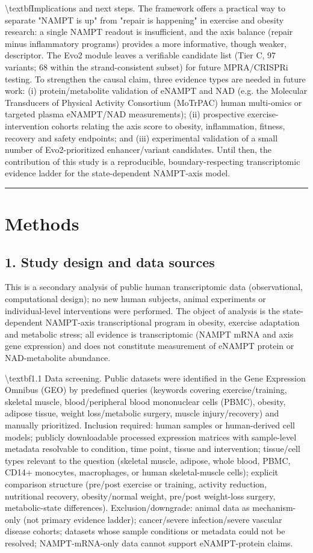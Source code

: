 \documentclass[11pt]{article}
\begin{document}
\textbackslash{}textbf{Implications and next steps.} The framework offers a practical way to separate "NAMPT is up" from "repair is happening" in exercise and obesity research: a single NAMPT readout is insufficient, and the axis balance (repair minus inflammatory programs) provides a more informative, though weaker, descriptor. The Evo2 module leaves a verifiable candidate list (Tier C, 97 variants; 68 within the strand-consistent subset) for future MPRA/CRISPRi testing. To strengthen the causal claim, three evidence types are needed in future work: (i) protein/metabolite validation of eNAMPT and NAD (e.g. the Molecular Transducers of Physical Activity Consortium (MoTrPAC) human multi-omics or targeted plasma eNAMPT/NAD measurements); (ii) prospective exercise-intervention cohorts relating the axis score to obesity, inflammation, fitness, recovery and safety endpoints; and (iii) experimental validation of a small number of Evo2-prioritized enhancer/variant candidates. Until then, the contribution of this study is a reproducible, boundary-respecting transcriptomic evidence ladder for the state-dependent NAMPT-axis model.

\vspace{4pt}\hrule\vspace{8pt}
\section*{Methods}
\subsection*{1. Study design and data sources}
This is a secondary analysis of public human transcriptomic data (observational, computational design); no new human subjects, animal experiments or individual-level interventions were performed. The object of analysis is the state-dependent NAMPT-axis transcriptional program in obesity, exercise adaptation and metabolic stress; all evidence is transcriptomic (NAMPT mRNA and axis gene expression) and does not constitute measurement of eNAMPT protein or NAD-metabolite abundance.

\textbackslash{}textbf{1.1 Data screening.} Public datasets were identified in the Gene Expression Omnibus (GEO) by predefined queries (keywords covering exercise/training, skeletal muscle, blood/peripheral blood mononuclear cells (PBMC), obesity, adipose tissue, weight loss/metabolic surgery, muscle injury/recovery) and manually prioritized. Inclusion required: human samples or human-derived cell models; publicly downloadable processed expression matrices with sample-level metadata resolvable to condition, time point, tissue and intervention; tissue/cell types relevant to the question (skeletal muscle, adipose, whole blood, PBMC, CD14+ monocytes, macrophages, or human skeletal-muscle cells); explicit comparison structure (pre/post exercise or training, activity reduction, nutritional recovery, obesity/normal weight, pre/post weight-loss surgery, metabolic-state differences). Exclusion/downgrade: animal data as mechanism-only (not primary evidence ladder); cancer/severe infection/severe vascular disease cohorts; datasets whose sample conditions or metadata could not be resolved; NAMPT-mRNA-only data cannot support eNAMPT-protein claims.
\end{document}
